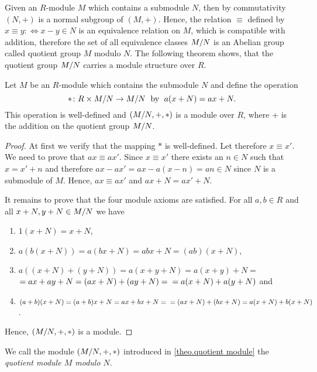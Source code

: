 Given an $R$-module $M$ which contains a submodule $N$, then by commutativity $(N,+)$ is a normal subgroup of $(M,+)$. Hence, the relation $\equiv$ defined by $x\equiv y:\Leftrightarrow x-y\in N$ is an equivalence relation on $M$, which is compatible with addition, therefore the set of all equivalence classes $M/N$ is an Abelian group called quotient group $M$ modulo $N$. The following theorem shows, that the quotient group $M/N$ carries a module structure over $R$.

\begin{thm} \label{theo.quotient module}
Let $M$ be an $R$-module which contains the submodule $N$ and define the operation 
\[ \ast\colon R\times M/N\rightarrow M/N\;\text{ by }\;a(x+N)=ax+N. \]
This operation is well-defined and $(M/N,+,\ast)$ is a module over $R$, where + is the addition on the quotient group $M/N$.
\end{thm}

\begin{proof}
At first we verify that the mapping $\ast$ is well-defined. Let therefore $x\equiv x'$. We need to prove that $ax\equiv ax'$. Since $x\equiv x'$ there exists an $n\in N$ such that $x=x'+n$ and therefore $ax-ax'=ax-a(x-n)=an\in N$ since $N$ is a submodule of $M$. Hence, $ax\equiv ax'$ and $ax+N=ax'+N$. 

It remains to prove that the four module axioms are satisfied. For all $a,b\in R$ and all $x+N,y+N\in M/N$ we have
\begin{enumerate}
\item $1(x+N)=x+N$,
\item $a(b(x+N))=a(bx+N)=abx+N=(ab)(x+N)$,
\item $a((x+N)+(y+N))=a(x+y+N)=a(x+y)+N=$
    $=ax+ay+N=(ax+N)+(ay+N)=\\
    =a(x+N)+a(y+N)$ and
\item $(a+b)(x+N)=(a+b)x+N=ax+bx+N=\\
    =(ax+N)+(bx+N)=a(x+N)+b(x+N)$.
\end{enumerate}
Hence, $(M/N,+,\ast)$ is a module.
\end{proof}

\begin{defin}
We call the module $(M/N,+,\ast)$ introduced in \cref{theo.quotient module} the \emph{quotient module $M$ modulo $N$}.
\end{defin}

